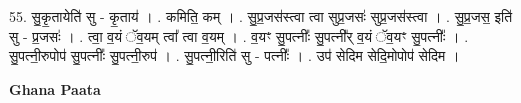 \documentclass[17pt]{extarticle}
\begin{document}
55. सु॒कृ॒तायेति॑ सु - कृ॒ताय॑ । . कमिति॒ कम् । . सु॒प्र॒जस॑स्त्वा त्वा सुप्र॒जसः॑ सुप्र॒जस॑स्त्वा । . सु॒प्र॒जस॒ इति॑ सु - प्र॒जसः॑ । . त्वा॒ व॒यं ॅव॒यम् त्वा᳚ त्वा व॒यम् । . व॒यꣳ सु॒पत्नीः᳚ सु॒पत्नी᳚र् व॒यं ॅव॒यꣳ सु॒पत्नीः᳚ । . सु॒पत्नी॒रुपोप॑ सु॒पत्नीः᳚ सु॒पत्नी॒रुप॑ । . सु॒पत्नी॒रिति॑ सु - पत्नीः᳚ । . उप॑ सेदिम सेदि॒मोपोप॑ सेदिम । \newline

\textbf{Ghana Paata } \newline
\end{document}
